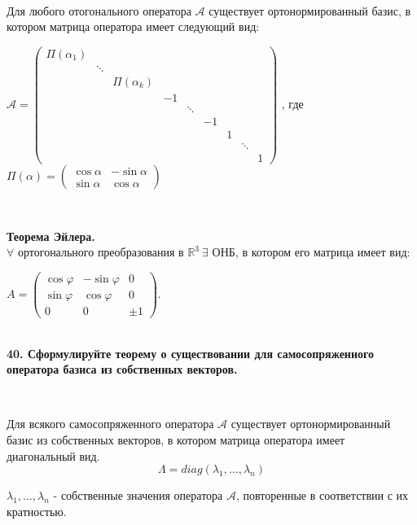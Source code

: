\documentclass{article}
\begin{document}
	{
		$\;$
		\setlength{\parindent}{0.4cm}
		\hangindent=0.4cm
		
		Для любого отогонального оператора $\mathcal{A}$ существует ортонормированный базис, в котором матрица оператора имеет следующий вид:
		
		\begin{center}
		
		$
		\mathcal{A} = 
		\begin{pmatrix}
		\Pi(\alpha_1) & && &&&&& \\
		& \ddots &&&&&& &\\
		&& \Pi(\alpha_k)&&&&&& \\
		&&& -1 &&&& &\\
		&&&& \ddots &&&& \\
		&&&&& -1 &&& \\
		&&&&&& 1 && \\
		&&&&&&& \ddots & \\
		&&&&&&&& 1 
		\end{pmatrix}
		$ , где $\Pi(\alpha) = \begin{pmatrix}
		\cos \alpha & -\sin \alpha \\
		\sin \alpha & \cos \alpha
		\end{pmatrix}$
		
		\end{center}
		
		$\;$
		
		\textbf{Теорема Эйлера.} \\
		$\forall$ ортогонального преобразования в $\mathbb{R}^3\ \exists$ ОНБ, в котором его матрица имеет вид$:$
		
        $A=\begin{pmatrix}
        \cos\varphi&-\sin\varphi&0\\
        \sin\varphi&\cos\varphi&0\\
        0&0&\pm1
        \end{pmatrix}$.\\
		
		$\:$ 
		
		\setlength{\parindent}{0cm}
		\hangindent=0cm
	}

	\textbf{40. Сформулируйте теорему о существовании для самосопряженного оператора базиса из собственных векторов.}
	
	{
		$\;$
		\setlength{\parindent}{0.4cm}
		\hangindent=0.4cm
		
		Для всякого самосопряженного оператора $\mathcal{A}$ существует ортонормированный базис из собственных векторов, в котором матрица оператора имеет диагональный вид.
		$$\Lambda=diag(\lambda_1,\dots,\lambda_n)$$
		
		
		$\lambda_1,\dots,\lambda_n$ - собственные значения оператора $\mathcal{A}$, повторенные в соответствии с их кратностью.
		
		$\;$
		\setlength{\parindent}{0cm}
		\hangindent=0cm
	}
\end{document}
